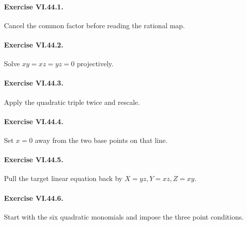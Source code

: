 \paragraph{Exercise VI.44.1.}
\begin{hint}
Cancel the common factor before reading the rational map.
\end{hint}

\paragraph{Exercise VI.44.2.}
\begin{hint}
Solve \(xy=xz=yz=0\) projectively.
\end{hint}

\paragraph{Exercise VI.44.3.}
\begin{hint}
Apply the quadratic triple twice and rescale.
\end{hint}

\paragraph{Exercise VI.44.4.}
\begin{hint}
Set \(x=0\) away from the two base points on that line.
\end{hint}

\paragraph{Exercise VI.44.5.}
\begin{hint}
Pull the target linear equation back by \(X=yz,Y=xz,Z=xy\).
\end{hint}

\paragraph{Exercise VI.44.6.}
\begin{hint}
Start with the six quadratic monomials and impose the three point conditions.
\end{hint}

